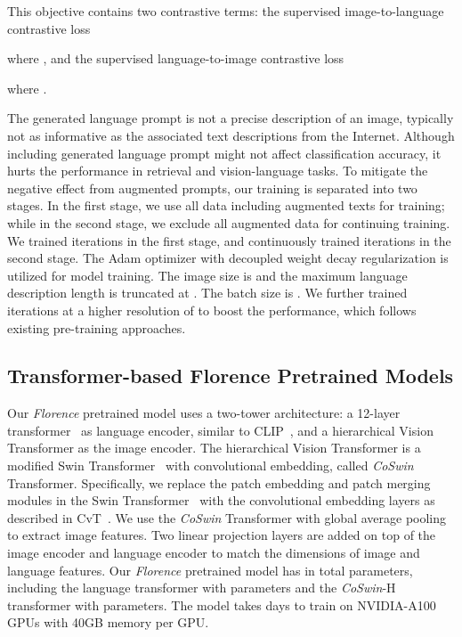 \documentclass{article}
\begin{document}
This objective contains two contrastive terms: the supervised image-to-language contrastive loss

where , and the supervised
language-to-image contrastive loss

where .

The generated language prompt is not a precise description of an image, typically not as informative as the associated text descriptions from the Internet. Although including generated language prompt might not affect classification accuracy, it hurts the performance in retrieval and vision-language tasks. To mitigate the negative effect from augmented prompts, our training is separated into two stages. In the first stage, we use
all data including augmented texts for training; while in the second stage, we exclude all augmented
data for continuing training. We trained  iterations in the first stage, and continuously
trained  iterations in the second stage. The Adam optimizer with decoupled weight decay
regularization is utilized for model training. The image size is  and the maximum
language description length is truncated at . The batch size is . We further trained
 iterations at a higher resolution of  to boost the performance, which follows
existing pre-training approaches.


\subsection{Transformer-based Florence Pretrained Models}
\label{sect:architecture}

Our \emph{Florence} pretrained model uses a two-tower architecture: a 12-layer transformer~\cite{NIPS2017_3f5ee243} as language encoder, similar to CLIP~\cite{radford2021learning}, and a
hierarchical Vision Transformer as the image encoder. The hierarchical Vision Transformer is
a modified Swin Transformer~\cite{liu2021Swin} with convolutional embedding, called \emph{CoSwin} Transformer. Specifically, we replace the patch embedding and patch merging
modules in the Swin Transformer~\cite{liu2021Swin} with the convolutional embedding layers as
described in CvT~\cite{Wu_2021_ICCV}. We use the \emph{CoSwin} Transformer with global average
pooling to extract image features. Two linear projection layers are added on top of the image
encoder and language encoder to match the dimensions of image and language features. Our \emph{Florence} pretrained model has
in total  parameters, including the language transformer with  parameters and the
\emph{CoSwin}-H transformer with  parameters. The model takes  days to train on 
NVIDIA-A100 GPUs with 40GB memory per GPU.
\end{document}
